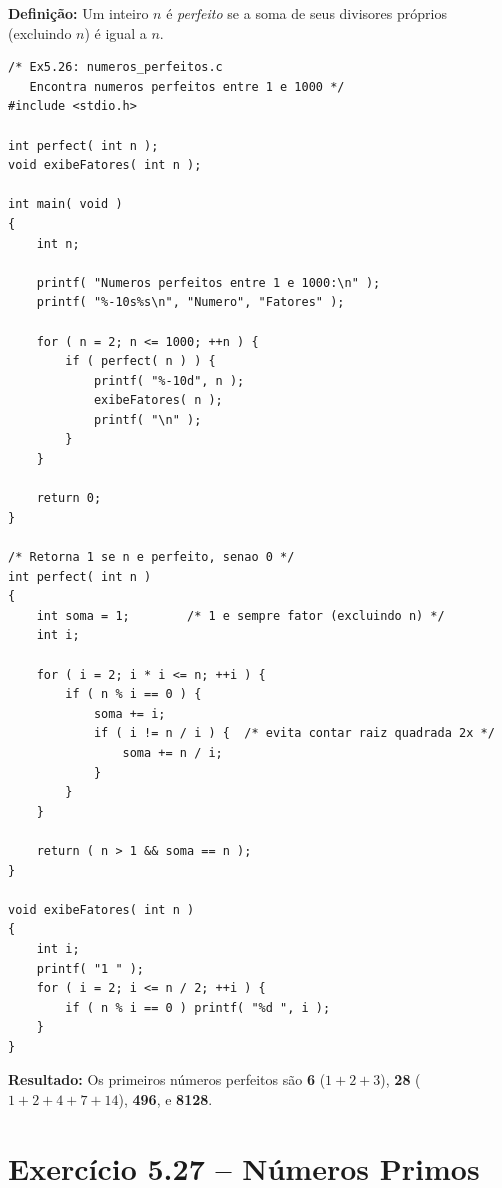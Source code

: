 \documentclass[12pt,a4paper]{article}
\begin{document}
\begin{respostabox}
\textbf{Definição:} Um inteiro $n$ é \textit{perfeito} se a soma de seus divisores
próprios (excluindo $n$) é igual a $n$.

\begin{lstlisting}
/* Ex5.26: numeros_perfeitos.c
   Encontra numeros perfeitos entre 1 e 1000 */
#include <stdio.h>

int perfect( int n );
void exibeFatores( int n );

int main( void )
{
    int n;

    printf( "Numeros perfeitos entre 1 e 1000:\n" );
    printf( "%-10s%s\n", "Numero", "Fatores" );

    for ( n = 2; n <= 1000; ++n ) {
        if ( perfect( n ) ) {
            printf( "%-10d", n );
            exibeFatores( n );
            printf( "\n" );
        }
    }

    return 0;
}

/* Retorna 1 se n e perfeito, senao 0 */
int perfect( int n )
{
    int soma = 1;        /* 1 e sempre fator (excluindo n) */
    int i;

    for ( i = 2; i * i <= n; ++i ) {
        if ( n % i == 0 ) {
            soma += i;
            if ( i != n / i ) {  /* evita contar raiz quadrada 2x */
                soma += n / i;
            }
        }
    }

    return ( n > 1 && soma == n );
}

void exibeFatores( int n )
{
    int i;
    printf( "1 " );
    for ( i = 2; i <= n / 2; ++i ) {
        if ( n % i == 0 ) printf( "%d ", i );
    }
}
\end{lstlisting}

\textbf{Resultado:} Os primeiros números perfeitos são \textbf{6} ($1+2+3$),
\textbf{28} ($1+2+4+7+14$), \textbf{496}, e \textbf{8128}.
\end{respostabox}

\section{Exercício 5.27 -- Números Primos}
\end{document}
